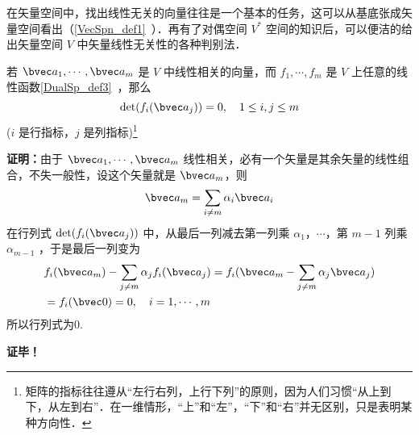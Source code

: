 
在矢量空间中，找出线性无关的向量往往是一个基本的任务，这可以从基底张成矢量空间看出（\autoref{VecSpn_def1}~）．再有了对偶空间 $V^*$ 空间的知识后，可以便洁的给出矢量空间 $V$ 中矢量线性无关性的各种判别法．
\begin{lemma}{}\label{LinInD_lem1}
若 $\bvec a_1,\cdots,\bvec a_m$ 是 $V$ 中线性相关的向量，而 $f_1,\cdots,f_m$ 是 $V$ 上任意的线性函数\autoref{DualSp_def3}~，那么
\begin{equation}
\det(f_i(\bvec a_j))=0,\quad 1\leq i,j\leq m
\end{equation}
($i$ 是行指标，$j$ 是列指标)\footnote{矩阵的指标往往遵从“左行右列，上行下列”的原则，因为人们习惯“从上到下，从左到右”．在一维情形，“上”和“左”，“下”和“右”并无区别，只是表明某种方向性．}
\end{lemma}
\textbf{证明：}由于 $\bvec a_1,\cdots,\bvec a_m$ 线性相关，必有一个矢量是其余矢量的线性组合，不失一般性，设这个矢量就是 $\bvec a_m$，则
\begin{equation}
\bvec a_m=\sum_{i\neq m}\alpha_i\bvec a_i
\end{equation}
在行列式 $\det(f_i(\bvec a_j))$ 中，从最后一列减去第一列乘 $\alpha_1$，$\cdots$，第 $m-1$ 列乘 $\alpha_{m-1}$ ，于是最后一列变为
\begin{equation}
\begin{aligned}
&f_i(\bvec a_m)-\sum_{j\neq m}\alpha_j f_i(\bvec a_j)=f_i(\bvec a_m-\sum_{j\neq m}\alpha_{j}\bvec a_j)\\
&=f_i(\bvec 0)=0,\quad i=1,\cdots ,m
\end{aligned}
\end{equation}
所以行列式为0.

\textbf{证毕！}

